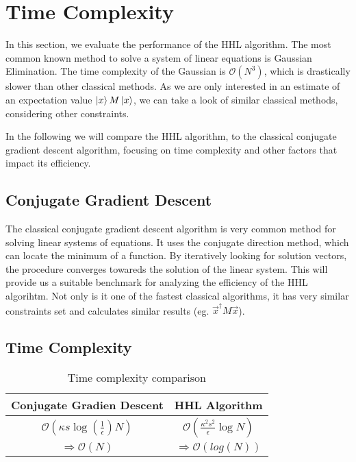 \section{Time Complexity}

\begin{comment}
look at gauß verfahren 
not fastest
look at same constraints 
conjugate gradient descent much faster with similiar requirements
only interested in estimate of $\vec{x}^\dagger M \vec x$
this runs in $ \mathcal{O}(\kappa s log{\left(\frac 1 \epsilon\right)} N ) $
where 
\end{comment}

In this section, we evaluate the performance of the HHL algorithm.
The most common known method to solve a system of linear equations is Gaussian Elimination. 
The time complexity of the Gaussian is $\mathcal{O} (N^3)$, which is drastically slower than other classical methods.
As we are only interested in an estimate of an expectation value $\ket x M \ket x$, we can take a look of similar classical methods, considering other constraints.

In the following we will compare the HHL algorithm, to the classical conjugate gradient descent algorithm, focusing on time complexity and other factors that impact its efficiency.

\subsection{Conjugate Gradient Descent}
The classical conjugate gradient descent algorithm is very common method for solving linear systems of equations. 
It uses the conjugate direction method, which can locate the minimum of a function. 
By iteratively looking for solution vectors, the procedure converges towareds the solution of the linear system.
This will provide us a suitable benchmark for analyzing the efficiency of the HHL algorihtm.
Not only is it one of the fastest classical algorithms, it has very similar constraints set and calculates similar results (eg. $\vec{x}^\dagger M \vec x$).

\subsection{Time Complexity}
\begin{table}[htbp]
    \caption{Time complexity comparison}
    \begin{center}
    \begin{tabular}{|c|c|}
    \hline
    \textbf{Conjugate Gradien Descent} & \textbf{HHL Algorithm} \\
    \hline
    $\mathcal{O}(\kappa s \log\left(\frac{1}{\epsilon}\right) N)$  &  $\mathcal{O}\left(\frac{\kappa^2s^2}{\epsilon}\log N\right)$\\
    \hline
    $\Rightarrow \mathcal{O} (N)$ & $\Rightarrow \mathcal{O} (log(N))$\\ 
    \hline
    \end{tabular}
    \end{center}
\end{table}

